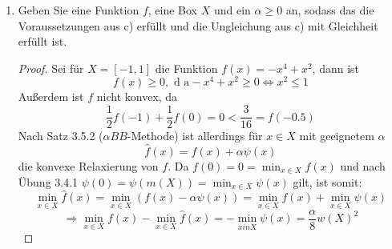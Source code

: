 \documentclass[12pt]{extreport} %
\begin{document}
\begin{enumerate}
		$$ v - \hat{v} \leq \frac{\alpha}{8} w(X)^2 $$
		\begin{proof}
			Da die Voraussetzungen von a) und b) gelten und nach Übung 3.4.1 
			$$ \psi(x) \geq \min_{x \in X} \psi(x) = -\frac{1}{8} w(X)^2, $$
			folgt die Behauptung aus b), indem man 
			$$ g(x) \coloneqq \alpha \psi(x) \quad \forall x \in X $$
			setzt, damit nicht $g(x) \geq -2$ sondern $g(x) \geq \alpha \min_{x \in X} \psi(x) = - \frac{\alpha}{8} w(X)^2$, und da nach Satz 3.4.3 folgt, dass $\hat{f} = f + \psi$ eine konvexe Relaxierung von $f$ auf $X$ ist.
		\end{proof}
	\item Geben Sie eine Funktion $f$, eine Box $X$ und ein $\alpha \geq 0$ an, sodass das die Voraussetzungen aus c) erfüllt und die Ungleichung aus c) mit Gleichheit erfüllt ist.
		\begin{proof}
			Sei für $X = [-1, 1]$ die Funktion $f(x) = - x^4 +  x^2$, dann ist 
			$$ f(x) \geq 0, \text{ d a} - x^4 +  x^2 \geq 0 \iff x^2 \leq 1 $$
			Außerdem ist $f$ nicht konvex, da
			$$ \frac{1}{2} f(-1) + \frac{1}{2} f(0) = 0 < \frac{3}{16} = f(-0.5) $$
			Nach Satz 3.5.2 ($\alpha BB$-Methode) ist allerdings für $x \in X$ mit geeignetem $\alpha$
			$$ \hat{f}(x) = f(x) + \alpha \psi(x) $$
		 die konvexe Relaxierung von $f$. Da $f(0) = 0 = \min_{x \in X} f(x)$ und nach Übung 3.4.1 $\psi(0) = \psi(m(X)) = \min_{x \in X} \psi(x)$ gilt, ist somit:
			$$ \min_{x \in X} \hat{f}(x) = \min_{x \in X} \left( f(x) - \alpha \psi(x) \right) = \min_{x \in X} f(x) + \min_{x \in X} \psi(x)  $$
			$$ \Rightarrow \min_{x \in X} f(x) - \min_{x \in X} \hat{f}(x) = - \min_{x in X} \psi(x) =  \frac{\alpha}{8} w(X)^2  $$
		\end{proof}
\end{enumerate}
\end{document}
